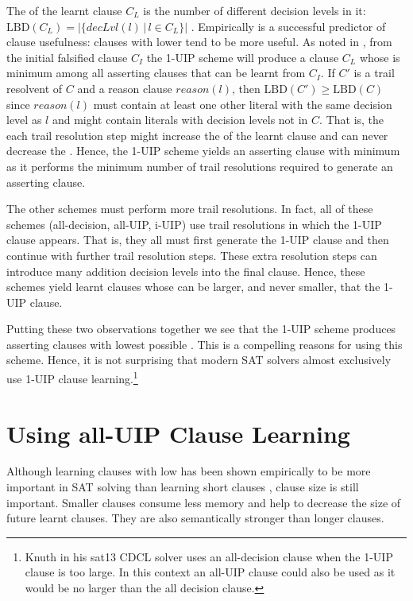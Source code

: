 \documentclass[runningheads]{llncs}
\newcommand{\sat}{SAT\xspace}
\newcommand{\oneuip}{1-UIP\xspace}
\newcommand{\alluip}{all-UIP\xspace}
\newcommand{\LBD}{\text{LBD}\xspace}
\newcommand{\dlevel}[1]{\ensuremath{\mathit{decLvl}(#1)}}
\newcommand{\reason}[1]{\ensuremath{\mathit{reason}(#1)}}
\begin{document}
The \LBD of the learnt clause $C_L$ is the number of different decision
levels in it:
$\LBD(C_L)=\left|\big\{\dlevel{l}\,|\,l \in C_L\big\}\right|$
\cite{DBLP:conf/ijcai/AudemardS09}. Empirically \LBD is a successful
predictor of clause usefulness: clauses with lower \LBD tend to be more
useful. As noted in \cite{DBLP:conf/ijcai/AudemardS09}, from the
initial falsified clause $C_I$ the \oneuip scheme will produce a clause
$C_L$ whose \LBD is minimum among all asserting clauses that can be
learnt from $C_I$. If $C'$ is a trail resolvent of $C$ and a reason
clause $\reason{l}$, then $\LBD(C') \geq \LBD(C)$ since $\reason{l}$
must contain at least one other literal with the same decision level
as $l$ and might contain literals with decision levels not in
$C$. That is, the each trail resolution step might increase the \LBD
of the learnt clause and can never decrease the \LBD. Hence, the \oneuip
scheme yields an asserting clause with minimum \LBD as it performs the
minimum number of trail resolutions required to generate an asserting
clause.

The other schemes must perform more trail resolutions. In fact, all of
these schemes (all-decision, all-UIP, i-UIP) use trail resolutions in
which the \oneuip clause appears. That is, they all must first generate
the \oneuip clause and then continue with further trail resolution
steps. These extra resolution steps can introduce many addition
decision levels into the final clause. Hence, these schemes yield
learnt clauses whose \LBD can be larger, and never smaller, that the
\oneuip clause.

Putting these two observations together we see that the \oneuip scheme
produces asserting clauses with lowest possible \LBD. This is a
compelling reasons for using this scheme. Hence, it is not surprising
that modern \sat solvers almost exclusively use \oneuip clause
learning.\footnote{Knuth in his sat13 CDCL solver \cite{Knuth:Sat13}
  uses an all-decision clause when the \oneuip clause is too large. In
  this context an \alluip clause could also be used as it would be no
  larger than the all decision clause.}

\section{Using \alluip Clause Learning}
\label{sec:i-uip}
Although learning clauses with low \LBD has been shown empirically to
be more important in \sat solving than learning short clauses
\cite{DBLP:conf/ijcai/AudemardS09}, clause size is still
important. Smaller clauses consume less memory and help to decrease
the size of future learnt clauses. They are also semantically stronger
than longer clauses.
\end{document}
